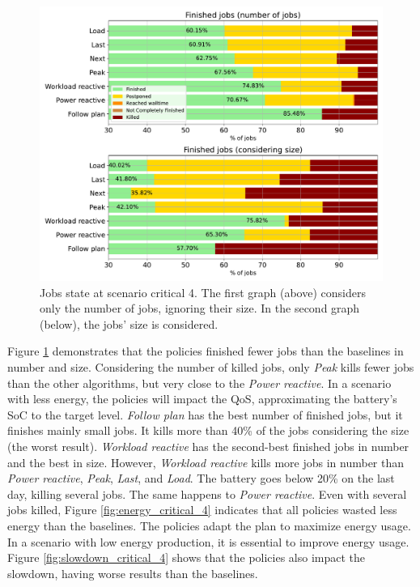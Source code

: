\begin{figure}[!htb]
    \centering
    \includegraphics[scale=0.55]{Images/Compensations/jobs_critical_4.pdf}
    \caption[Jobs state at scenario critical 4.]{Jobs state at scenario critical 4. The first graph (above) considers only the number of jobs, ignoring their size. In the second graph (below), the jobs' size is considered.}
    \label{fig:jobs_critical_4}
\end{figure}

Figure \ref{fig:jobs_critical_4} demonstrates that the policies finished fewer jobs than the baselines in number and size. Considering the number of killed jobs, only \emph{Peak} kills fewer jobs than the other algorithms, but very close to the \emph{Power reactive}. In a scenario with less energy, the policies will impact the QoS, approximating the battery's SoC to the target level. \emph{Follow plan} has the best number of finished jobs, but it finishes mainly small jobs. It kills more than 40\% of the jobs considering the size (the worst result). \emph{Workload reactive} has the second-best finished jobs in number and the best in size. However, \emph{Workload reactive} kills more jobs in number than \emph{Power reactive}, \emph{Peak}, \emph{Last}, and \emph{Load}. The battery goes below 20\% on the last day, killing several jobs. The same happens to \emph{Power reactive}. Even with several jobs killed, Figure \ref{fig:energy_critical_4} indicates that all policies wasted less energy than the baselines. The policies adapt the plan to maximize energy usage. In a scenario with low energy production, it is essential to improve energy usage. Figure \ref{fig:slowdown_critical_4} shows that the policies also impact the slowdown, having worse results than the baselines. 

